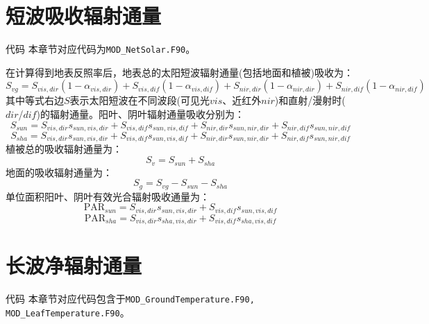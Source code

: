 \section{短波吸收辐射通量}\label{短波吸收辐射通量}
\begin{mymdframed}{代码}
本章节对应代码为\texttt{MOD\_NetSolar.F90}。
\end{mymdframed}

在计算得到地表反照率后，地表总的太阳短波辐射通量(包括地面和植被)吸收为：
\begin{equation}
S_{v g}=S_{vis,dir}\left(1-\alpha_{vis,dir}\right)+S_{vis,dif}\left(1-\alpha_{vis,dif}\right)+
S_{nir,dir}\left(1-\alpha_{nir,dir}\right)+S_{nir,dif}\left(1-\alpha_{nir,dif}\right)
\end{equation}
其中等式右边$S$表示太阳短波在不同波段(可见光$vis$、近红外$nir$)和直射/漫射时($dir$/$dif$)的辐射通量。阳叶、阴叶辐射通量吸收分别为：
\begin{equation}
S_{s u n}=S_{vi s, dir} s_{s u n, vi s, dir}+S_{vis, dif} s_{s u n, vis, dif}+S_{ni r, dir} s_{s u n, ni r, dir}+S_{nir, dif} s_{s u n, nir, dif}
\end{equation}
\begin{equation}
S_{s h a}=S_{vis, dir} s_{sun,vis,dir}+S_{vis, dif} s_{sun,vis,dif}+S_{ni r, dir} s_{sun,nir,dir}+S_{nir, dif} s_{sun,nir,dif}
\end{equation}
植被总的吸收辐射通量为：
\begin{equation}
S_{v}=S_{s u n}+S_{s h a}
\end{equation}
地面的吸收辐射通量为：
\begin{equation}\label{eq:sg}
S_{g}=S_{v g}-S_{s u n}-S_{s h a}
\end{equation}
单位面积阳叶、阴叶有效光合辐射吸收通量为：
\begin{equation}
\text{PAR}_{sun} =S_{vis, dir} s_{sun, vis, dir}+S_{vis, dif} s_{sun, vis, dif}
\end{equation}
\begin{equation}
\text{PAR}_{sha} =S_{vis, dir} s_{sha, vis, dir}+S_{vis, dif} s_{sha, vis, dif}
\end{equation}


\section{长波净辐射通量}\label{长波净辐射通量}
\begin{mymdframed}{代码}
本章节对应代码包含于\texttt{MOD\_GroundTemperature.F90, MOD\_LeafTemperature.F90}。
\end{mymdframed}

